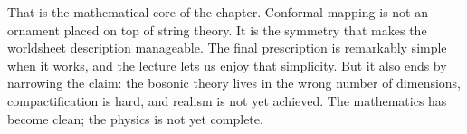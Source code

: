 That is the mathematical core of the chapter. Conformal mapping is not an ornament placed on top of string theory. It is the symmetry that makes the worldsheet description manageable. The final prescription is remarkably simple when it works, and the lecture lets us enjoy that simplicity. But it also ends by narrowing the claim: the bosonic theory lives in the wrong number of dimensions, compactification is hard, and realism is not yet achieved. The mathematics has become clean; the physics is not yet complete.